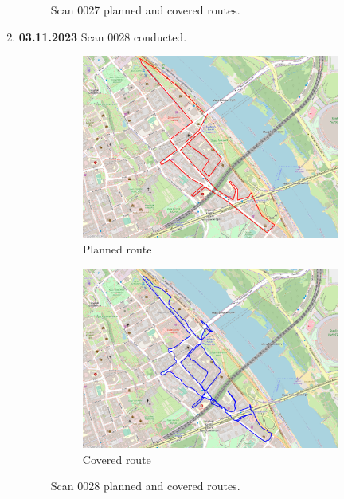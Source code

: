 \documentclass[a4paper,12pt]{article}
\begin{document}
\begin{enumerate}
\begin{figure}[H]
		\caption{Scan 0027 planned and covered routes.}
		\label{fig:fig27}
	\end{figure}
	\item \textbf{03.11.2023} Scan 0028 conducted.
	\begin{figure}[H]
		\centering
		\begin{subfigure}{.95\textwidth}
			\centering
			\includegraphics[width=1\linewidth]{route_p28}
			\caption{Planned route}
			\label{fig:a28}
		\end{subfigure}%
		\linebreak
		\begin{subfigure}{.95\textwidth}
			\centering
			\includegraphics[width=1\linewidth]{route_c28}
			\caption{Covered route}
			\label{fig:b28}
		\end{subfigure}
		\caption{Scan 0028 planned and covered routes.}
		\label{fig:fig28}
	\end{figure}
\end{enumerate}
\end{document}
